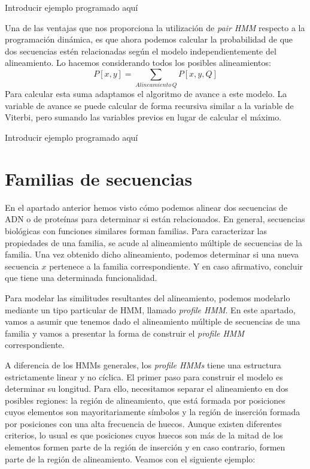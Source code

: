 \begin{exampleth}
    Introducir ejemplo programado aquí
\end{exampleth}

Una de las ventajas que nos proporciona la utilización de \textit{pair HMM} respecto a la programación dinámica, es que ahora podemos calcular la probabilidad de que dos secuencias estén relacionadas según el modelo independientemente del alineamiento. Lo hacemos considerando todos los posibles alineamientos:
\[P[x,y]=\sum_{Alineamiento\, Q}P[x,y,Q]\]
Para calcular esta suma adaptamos el algoritmo de avance a este modelo. La variable de avance se puede calcular de forma recursiva similar a la variable de Viterbi, pero sumando las variables previos en lugar de calcular el máximo.

\begin{exampleth}
    Introducir ejemplo programado aquí
\end{exampleth}

\section{Familias de secuencias}
En el apartado anterior hemos visto cómo podemos alinear dos secuencias de ADN o de proteínas para determinar si están relacionados. En general, secuencias biológicas con funciones similares forman familias. Para caracterizar las propiedades de una familia, se acude al alineamiento múltiple de secuencias de la familia. Una vez obtenido dicho alineamiento, podemos determinar si una nueva secuencia $x$ pertenece a la familia correspondiente. Y en caso afirmativo, concluir que tiene una determinada funcionalidad. 

Para modelar las similitudes resultantes del alineamiento, podemos modelarlo mediante un tipo particular de HMM, llamado \textit{profile HMM}. En este apartado, vamos a asumir que tenemos dado el alineamiento múltiple de secuencias de una familia y vamos a presentar la forma de construir el \textit{profile HMM} correspondiente. 

A diferencia de los HMMs generales, los \textit{profile HMMs} tiene una estructura estrictamente linear y no cíclica. El primer paso para construir el modelo es determinar su longitud. Para ello, necesitamos separar el alineamiento en dos posibles regiones: la región de alineamiento, que está formada por posiciones cuyos elementos son mayoritariamente símbolos y la región de inserción formada por posiciones con una alta frecuencia de huecos. Aunque existen diferentes criterios, lo usual es que posiciones cuyos huecos son más de la mitad de los elementos formen parte de la región de inserción y en caso contrario, formen parte de la región de alineamiento. Veamos con el siguiente ejemplo:

